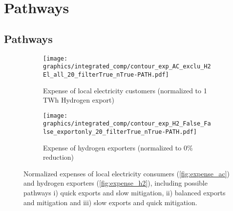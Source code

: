 \section{Pathways}
\label{subsec:pathways}

\subsection{Pathways}


\begin{figure*}[h!]
    \centering
    \begin{subfigure}[b]{0.49\linewidth}
        \centering
        \texttt{[image: graphics/integrated\_comp/contour\_exp\_AC\_exclu\_H2 El\_all\_20\_filterTrue\_nTrue-PATH.pdf]}
        \caption{Expense of local electricity customers (normalized to 1 TWh Hydrogen export)}
        \label{fig:expense_ac_path}
    \end{subfigure}
    \hfill
    \begin{subfigure}[b]{0.49\linewidth}
        \centering
        \texttt{[image: graphics/integrated\_comp/contour\_exp\_H2\_False\_False\_exportonly\_20\_filterTrue\_nTrue-PATH.pdf]}
        \caption{Expense of hydrogen exporters (normalized to 0\% \co reduction)}
        \label{fig:expense_h2_path}
    \end{subfigure}
    \hfill
    \caption{Normalized expenses of local electricity consumers (\ref{fig:expense_ac}) and hydrogen exporters (\ref{fig:expense_h2}), including possible pathways i) quick exports and slow mitigation, ii) balanced exports and mitigation and iii) slow exports and quick mitigation.}
    \label{fig:expenses_default_path}
\end{figure*}